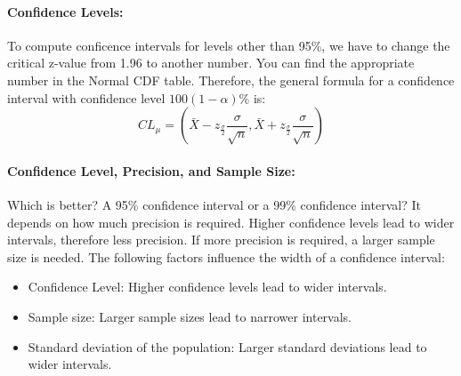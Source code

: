 \paragraph*{Confidence Levels:}
To compute conficence intervals for levels other than 95\%, we have to change the critical z-value from 1.96 to 
another number. You can find the appropriate number in the Normal CDF table. Therefore, the general formula for a
confidence interval with confidence level $100(1 - \alpha)\%$ is:
\[
    CL_\mu = (\bar{X} - z_\frac{\sigma}{2}\frac{\sigma}{\sqrt{n}}, \bar{X} + z_\frac{\sigma}{2}\frac{\sigma}{\sqrt{n}})
\]

\paragraph*{Confidence Level, Precision, and Sample Size:}
Which is better? A 95\% confidence interval or a 99\% confidence interval? It depends on how much precision is required. 
Higher confidence levels lead to wider intervals, therefore less precision. If more precision is required, a larger sample size is needed.
The following factors influence the width of a confidence interval:
\begin{itemize}
    \item Confidence Level: Higher confidence levels lead to wider intervals.
    \item Sample size: Larger sample sizes lead to narrower intervals.
    \item Standard deviation of the population: Larger standard deviations lead to wider intervals.
\end{itemize}